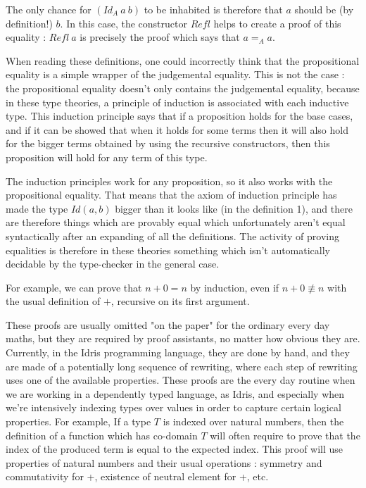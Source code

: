 The only chance for $(Id_A\ a\ b)$ to be inhabited is therefore that $a$ should be (by definition!) $b$. In this case, the constructor $Refl$ helps to create a proof of this equality : $Refl\ a$ is precisely the proof which says that $a=_Aa$. 

When reading these definitions, one could incorrectly think that the propositional equality is a simple wrapper of the judgemental equality. This is not the case : the propositional equality doesn't only contains the judgemental equality, because in these type theories, a principle of induction is associated with each inductive type. This induction principle says that if a proposition holds for the base cases, and if it can be showed that when it holds for some terms then it will also hold for the bigger terms obtained by using the recursive constructors, then this proposition will hold for any term of this type.

The induction principles work for any proposition, so it also works with the propositional equality. That means that the axiom of induction principle has made the type $Id(a,b)$ bigger than it looks like (in the definition 1), and there are therefore things which are provably equal which unfortunately aren't equal syntactically after an expanding of all the definitions. The activity of proving equalities is therefore in these theories something which isn't automatically decidable by the type-checker in the general case.

For example, we can prove that $n+0 = n$ by induction, even if $n+0 \not\equiv n$ with the usual definition of $+$, recursive on its first argument. 

These proofs are usually omitted "on the paper" for the ordinary every day maths, but they are required by proof assistants, no matter how obvious they are. Currently, in the Idris programming language, they are done by hand, and they are made of a potentially long sequence of rewriting, where each step of rewriting uses one of the available properties. 
These proofs are the every day routine when we are working in a dependently typed language, as Idris, and especially when we're intensively indexing types over values in order to capture certain logical properties.
For example, If a type $T$ is indexed over natural numbers, then the definition of a function which has co-domain $T$ will often require to prove that the index of the produced term is equal to the expected index. This proof will use properties of natural numbers and their usual operations : symmetry and commutativity for +, existence of neutral element for +, etc.

